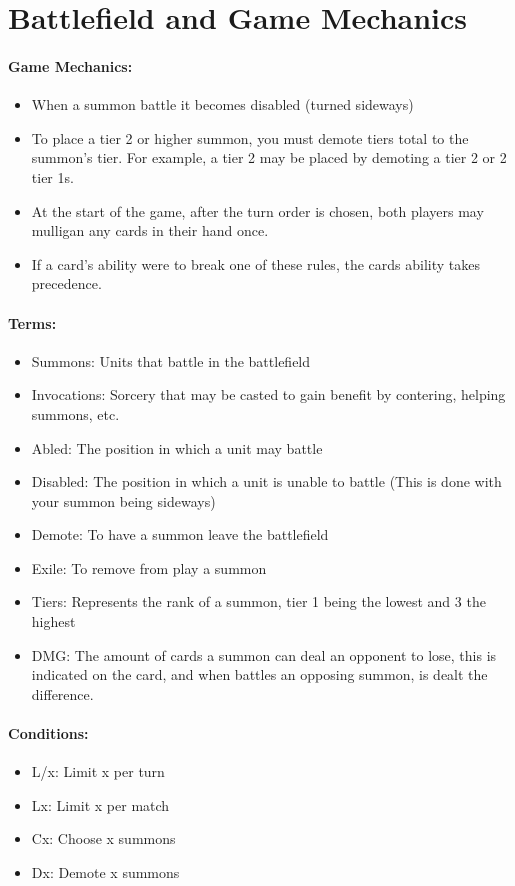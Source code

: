 \documentclass[12pt, letterpaper]{article}
\begin{document}
   \section{Battlefield and Game Mechanics}
   \paragraph{Game Mechanics: \\}
   \begin{itemize}
       \item When a summon battle it becomes disabled (turned sideways)
       \item To place a tier 2 or higher summon, you must demote tiers total to the summon's tier. 
       For example, a tier 2 may be placed by demoting a tier 2 or 2 tier 1s.
       \item At the start of the game, after the turn order is chosen, both players may mulligan any cards in their hand once.
        \item If a card’s ability were to break one of these rules, the cards ability takes precedence.
   \end{itemize}
   \paragraph{Terms:\\}
   \begin{itemize}
       \item Summons: Units that battle in the battlefield
       \item Invocations: Sorcery that may be casted to gain benefit by contering, helping summons, etc.
       \item Abled: The position in which a unit may battle
       \item Disabled: The position in which a unit is unable to battle (This is done with your summon being sideways)
       \item Demote: To have a summon leave the battlefield
       \item Exile: To remove from play a summon
       \item Tiers: Represents the rank of a summon, tier 1 being the lowest and 3 the highest
       \item DMG: The amount of cards a summon can deal an opponent to lose, this is indicated on the card, and when battles an opposing summon, is dealt the difference.
   \end{itemize}
   \paragraph{Conditions:}
   \begin{itemize}
       \item L/x: Limit x per turn
       \item Lx: Limit x per match
       \item Cx: Choose x summons 
       \item Dx: Demote x summons  
   \end{itemize}
\end{document}

